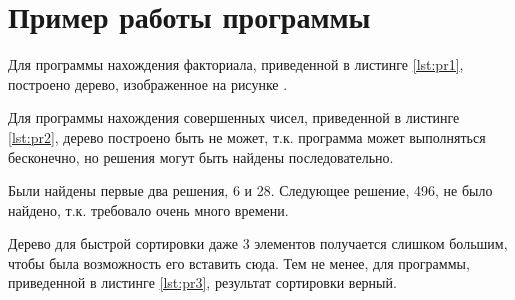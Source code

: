 \section{Пример работы программы}
Для программы нахождения факториала, приведенной в листинге \ref{lst:pr1}, построено дерево, изображенное на рисунке .

\begin{figure}[H]
\end{figure}

Для программы нахождения совершенных чисел, приведенной в листинге \ref{lst:pr2}, дерево построено быть не может, т.к. программа может выполняться бесконечно, но решения могут быть найдены последовательно.

Были найдены первые два решения, 6 и 28. Следующее решение, 496, не было найдено, т.к. требовало очень много времени.
 
Дерево для быстрой сортировки даже 3 элементов получается слишком большим, чтобы была возможность его вставить сюда. Тем не менее, для программы, приведенной в листинге \ref{lst:pr3}, результат сортировки верный.


